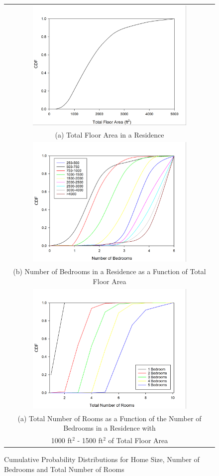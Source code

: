 \documentclass[12pt,twoside]{book}
\begin{document}
\begin{figure}[p]
\begin{tabular*}{\textwidth}{c}
\includegraphics[height=2.5in]{FIGURES/Total_Floor_Area} \\
(a) Total Floor Area in a Residence \\
\includegraphics[height=2.5in]{FIGURES/Number_of_Bedrooms} \\
(b) Number of Bedrooms in a Residence as a Function of Total Floor Area \\
\includegraphics[height=2.5in]{FIGURES/Total_Rooms} \\
(a) Total Number of Rooms as a Function of the Number of Bedrooms in a Residence with  \\
1000 ft$^2$ - 1500 ft$^2$ of Total Floor Area  \\
\end{tabular*}
\caption[Example Cumulative Probability Distributions for Home Size, Number of Bedrooms and Total Number of Rooms (excluding Bathrooms) taken from the 2015 U.S. Housing Survey]
{Cumulative Probability Distributions for Home Size, Number of Bedrooms and Total Number of Rooms}
\label{sample_room_distribution}
\end{figure}
\end{document}
